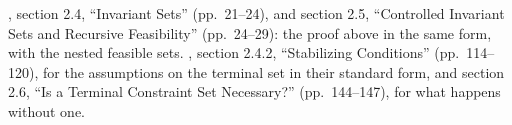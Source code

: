 \begin{reading}
, section 2.4, ``Invariant Sets'' (pp.~21--24), and section 2.5,
``Controlled Invariant Sets and Recursive Feasibility'' (pp.~24--29): the proof above in the
same form, with the nested feasible sets. , section 2.4.2,
``Stabilizing Conditions'' (pp.~114--120), for the assumptions on the terminal set in their
standard form, and section 2.6, ``Is a Terminal Constraint Set Necessary?'' (pp.~144--147), for
what happens without one.
\end{reading}
